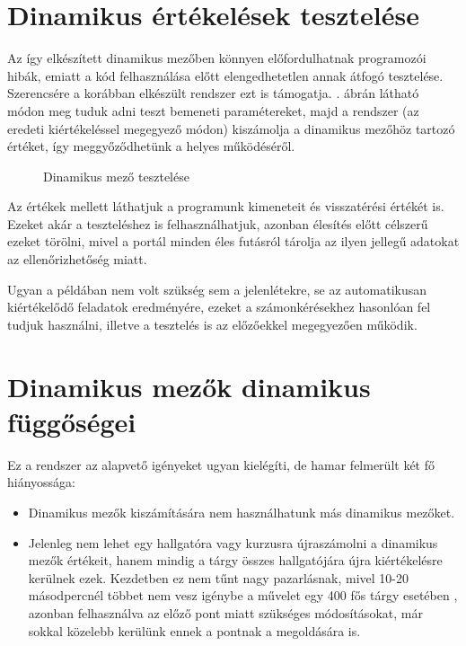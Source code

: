 \section{Dinamikus értékelések tesztelése}
Az így elkészített dinamikus mezőben könnyen előfordulhatnak programozói hibák, emiatt a kód felhasználása előtt elengedhetetlen annak átfogó tesztelése. Szerencsére a korábban elkészült rendszer ezt is támogatja. . ábrán látható módon meg tuduk adni teszt bemeneti paramétereket, majd a rendszer (az eredeti kiértékeléssel megegyező módon) kiszámolja a dinamikus mezőhöz tartozó értéket, így meggyőződhetünk a helyes működéséről.

\begin{figure}[h]
    \centering
    \caption{Dinamikus mező tesztelése}
    \label{fig:jporta_dynamic_test}
\end{figure}

Az értékek mellett láthatjuk a programunk kimeneteit és visszatérési értékét is. Ezeket akár a teszteléshez is felhasználhatjuk, azonban élesítés előtt célszerű ezeket törölni, mivel a portál minden éles futásról tárolja az ilyen jellegű adatokat az ellenőrizhetőség miatt.

Ugyan a példában nem volt szükség sem a jelenlétekre, se az automatikusan kiértékelődő feladatok eredményére, ezeket a számonkérésekhez hasonlóan fel tudjuk használni, illetve a tesztelés is az előzőekkel megegyezően működik.

\section{Dinamikus mezők dinamikus függőségei}
Ez a rendszer az alapvető igényeket ugyan kielégíti, de hamar felmerült két fő hiányossága:

\begin{itemize}
    \item Dinamikus mezők kiszámítására nem használhatunk más dinamikus mezőket. 
    \item Jelenleg nem lehet egy hallgatóra vagy kurzusra újraszámolni a dinamikus mezők értékeit, hanem mindig a tárgy összes hallgatójára újra kiértékelésre kerülnek ezek. Kezdetben ez nem tűnt nagy pazarlásnak, mivel 10-20 másodpercnél többet nem vesz igénybe a művelet egy 400 fős tárgy esetében \cite{KalmanMsc}, azonban felhasználva az előző pont miatt szükséges módosításokat, már sokkal közelebb kerülünk ennek a pontnak a megoldására is.
\end{itemize}

